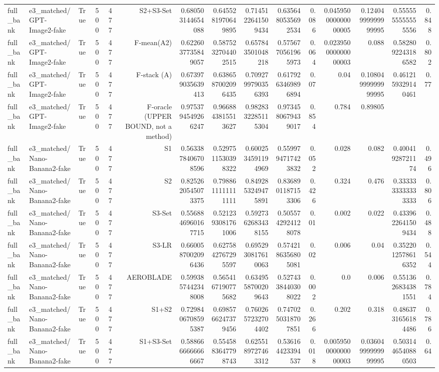 \begin{table}[htbp]
\begin{tabular}{llrrrrrrrrrrrrr}
full\_bank & e3\_matched/GPT-Image2-fake & True & 500 & 477 & S2+S3-Set & 0.680503144654088 & 0.6455281970649895 & 0.7145122641509434 & 0.6356480535692534 & 0.086 & 0.045950000000000005 & 0.12404999999999995 & 0.5555555555555556 & 0.848 \\
full\_bank & e3\_matched/GPT-Image2-fake & True & 500 & 477 & F-mean(A2) & 0.6226037735849057 & 0.5875232704402515 & 0.657843501048218 & 0.5756770561965973 & 0.064 & 0.023950000000000003 & 0.088 & 0.5828092243186582 & 0.802 \\
full\_bank & e3\_matched/GPT-Image2-fake & True & 500 & 477 & F-stack (A) & 0.673979035639413 & 0.6386587002096435 & 0.7092799790356393 & 0.6179263469896894 & 0.07 & 0.04 & 0.10804999999999995 & 0.4612159329140461 & 0.77 \\
full\_bank & e3\_matched/GPT-Image2-fake & True & 500 & 477 & F-oracle (UPPER BOUND, not a method) & 0.9753794549266247 & 0.9668843815513627 & 0.9828332285115304 & 0.9734580679439017 & 0.854 & 0.784 & 0.89805 &  &  \\
full\_bank & e3\_matched/Nano-Banana2-fake & True & 500 & 477 & S1 & 0.5633878406708596 & 0.5297511530398322 & 0.6002534591194969 & 0.5599794717423832 & 0.052 & 0.028 & 0.082 & 0.40041928721174 & 0.496 \\
full\_bank & e3\_matched/Nano-Banana2-fake & True & 500 & 477 & S2 & 0.8252620545073375 & 0.7988611111111111 & 0.8492853249475891 & 0.8368901187153306 & 0.426 & 0.324 & 0.476 & 0.3333333333333333 & 0.806 \\
full\_bank & e3\_matched/Nano-Banana2-fake & True & 500 & 477 & S3-Set & 0.5568846960167715 & 0.5212393081761006 & 0.5927362683438155 & 0.5055742924128078 & 0.01 & 0.002 & 0.022 & 0.4339622641509434 & 0.488 \\
full\_bank & e3\_matched/Nano-Banana2-fake & True & 500 & 477 & S3-LR & 0.6600587002096436 & 0.6275842767295597 & 0.6952930817610063 & 0.5742186356805081 & 0.02 & 0.006 & 0.04 & 0.3522012578616352 & 0.544 \\
full\_bank & e3\_matched/Nano-Banana2-fake & True & 500 & 477 & AEROBLADE & 0.5993857442348008 & 0.5654167190775682 & 0.6349558700209643 & 0.5274338440308022 & 0.002 & 0.0 & 0.006 & 0.5513626834381551 & 0.784 \\
full\_bank & e3\_matched/Nano-Banana2-fake & True & 500 & 477 & S1+S2 & 0.7298406708595387 & 0.6985766247379456 & 0.7602657232704402 & 0.7470250318707851 & 0.266 & 0.202 & 0.318 & 0.4863731656184486 & 0.786 \\
full\_bank & e3\_matched/Nano-Banana2-fake & True & 500 & 477 & S1+S3-Set & 0.5886666666666667 & 0.5545883647798743 & 0.6255189727463312 & 0.536164423394537 & 0.018 & 0.005950000000000003 & 0.03604999999999995 & 0.5031446540880503 & 0.64 \\

\end{tabular}
\end{table}
